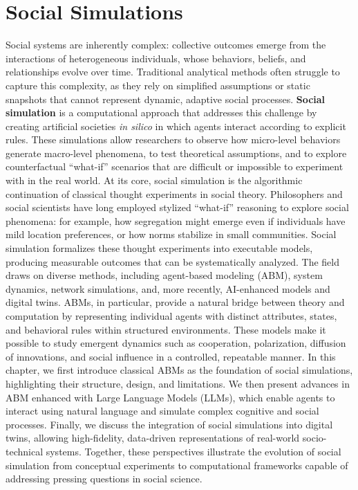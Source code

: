 \documentclass[11pt]{article}
\begin{document}
\section{Social Simulations}
\label{sec:introduction}
Social systems are inherently complex: collective outcomes emerge from the interactions of heterogeneous individuals, whose behaviors, beliefs, and relationships evolve over time. Traditional analytical methods often struggle to capture this complexity, as they rely on simplified assumptions or static snapshots that cannot represent dynamic, adaptive social processes.
\textbf{Social simulation} is a computational approach that addresses this challenge by creating artificial societies \textit{in silico} in which agents interact according to explicit rules. These simulations allow researchers to observe how micro-level behaviors generate macro-level phenomena, to test theoretical assumptions, and to explore counterfactual “what-if” scenarios that are difficult or impossible to experiment with in the real world.
At its core, social simulation is the algorithmic continuation of classical thought experiments in social theory. Philosophers and social scientists have long employed stylized “what-if” reasoning to explore social phenomena: for example, how segregation might emerge even if individuals have mild location preferences, or how norms stabilize in small communities. Social simulation formalizes these thought experiments into executable models, producing measurable outcomes that can be systematically analyzed.
The field draws on diverse methods, including agent-based modeling (ABM), system dynamics, network simulations, and, more recently, AI-enhanced models and digital twins. ABMs, in particular, provide a natural bridge between theory and computation by representing individual agents with distinct attributes, states, and behavioral rules within structured environments. These models make it possible to study emergent dynamics such as cooperation, polarization, diffusion of innovations, and social influence in a controlled, repeatable manner.
In this chapter, we first introduce classical ABMs as the foundation of social simulations, highlighting their structure, design, and limitations. We then present advances in ABM enhanced with Large Language Models (LLMs), which enable agents to interact using natural language and simulate complex cognitive and social processes. Finally, we discuss the integration of social simulations into digital twins, allowing high-fidelity, data-driven representations of real-world socio-technical systems. Together, these perspectives illustrate the evolution of social simulation from conceptual experiments to computational frameworks capable of addressing pressing questions in social science.
\end{document}
